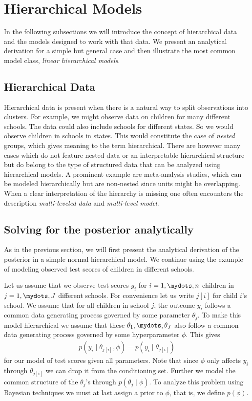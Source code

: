 \section{Hierarchical Models}
In the following subsections we will introduce the concept of hierarchical data
and the models designed to work with that data. We present an analytical
derivation for a simple but general case and then illustrate the most common
model class, \emph{linear hierarchical models}.

\subsection{Hierarchical Data}
Hierarchical data is present when there is a natural way to split observations
into clusters. For example, we might observe data on children for many different
schools. The data could also include schools for different states. So we would
observe children in schools in states. This would
constitute the case of \emph{nested} groups, which gives meaning to the term
hierarchical. There are however many cases which do not feature nested data
or an interpretable hierarchical structure but do belong to the type of structured
data that can be analyzed using hierarchical models. A prominent example are
meta-analysis studies, which can be modeled hierarchically but are non-nested
since units might be overlapping. When a clear interpretation of the hierarchy is missing
one often encounters the description \emph{multi-leveled data} and \emph{multi-level model}.

\subsection{Solving for the posterior analytically}
As in the previous section, we will first present the analytical derivation of
the posterior in a simple normal hierarchical model. We continue using the
example of modeling observed test scores of children in different schools.

Let us assume that we observe test scores $y_i$ for $i = 1,\mydots,n$ children
in $j=1,\mydots,J$ different schools. For convenience let us write $j[i]$ for child
$i$'s school. We assume that for all children in school $j$, the outcome $y_i$
follows a common data generating process governed by some parameter $\theta_j$.
To make this model hierarchical we assume that these $\theta_1,\mydots,\theta_J$
also follow a common data generating process governed by some hyperparameter $\phi$.
This gives
\begin{align}
  p(y_i \mid \theta_{j[i]}, \phi) = p(y_i \mid \theta_{j[i]})
\end{align}
for our model of test scores given all parameters. Note that since $\phi$ only
affects $y_i$ through $\theta_{j[i]}$ we can drop it from the conditioning set.
Further we model the common structure of the $\theta_j$'s through $p(\theta_j \mid \phi)$.
To analyze this problem using Bayesian techniques we must at last assign a prior
to $\phi$, that is, we define $p(\phi)$.

